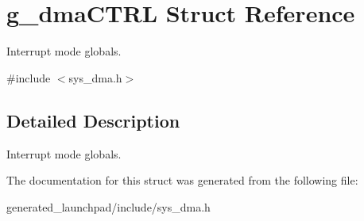 \hypertarget{structg__dmaCTRL}{}\section{g\+\_\+dma\+C\+T\+RL Struct Reference}
\label{structg__dmaCTRL}


Interrupt mode globals.  




{\ttfamily \#include $<$sys\+\_\+dma.\+h$>$}



\subsection{Detailed Description}
Interrupt mode globals. 

The documentation for this struct was generated from the following file\+:\begin{DoxyCompactItemize}
\item 
generated\+\_\+launchpad/include/sys\+\_\+dma.\+h\end{DoxyCompactItemize}
